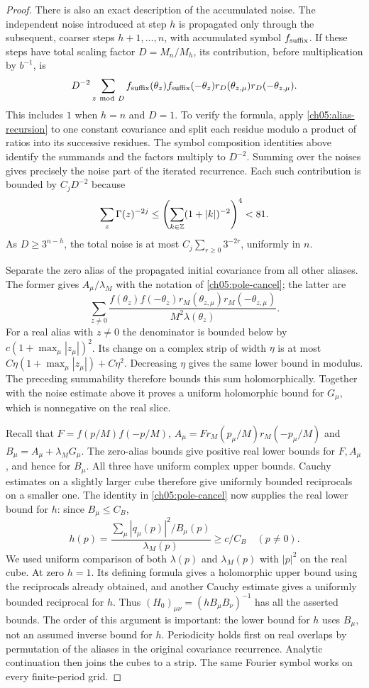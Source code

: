 \begin{proof}
There is also an exact description of the accumulated noise.
The independent noise introduced at step $h$ is propagated only
through the subsequent, coarser steps $h+1,\ldots,n$, with accumulated symbol $f_{\rm suffix}$. If these steps have total scaling factor
$D=M_n/M_h$, its contribution, before multiplication by $b^{-1}$,
is
\[
 D^{-2}\sum_{z\ {\rm mod}\ D}
   f_{\rm suffix}(\theta_z)f_{\rm suffix}(-\theta_z)
   r_D(\theta_{z,\mu})r_D(-\theta_{z,\mu}).
\]
This includes $1$ when $h=n$ and $D=1$.
To verify the formula, apply \eqref{ch05:alias-recursion} to one
constant covariance and split each residue modulo a product of
ratios into its successive residues. The symbol composition
identities above identify the summands and the factors multiply
to $D^{-2}$. Summing over the noises gives precisely the noise
part of the iterated recurrence.
Each such contribution is bounded by $C_jD^{-2}$ because
\[
 \sum_z\Gamma(z)^{-2j}\le
 \left(\sum_{k\in\mathbb Z}(1+|k|)^{-2}\right)^4<81.
\]
As $D\ge3^{n-h}$, the total noise is at most
$C_j\sum_{r\ge0}3^{-2r}$, uniformly in $n$.

Separate the zero alias of the propagated initial
covariance from all other aliases. The former gives
$A_\mu/\lambda_M$ with the notation of
\eqref{ch05:pole-cancel}; the latter are
\[
 \sum_{z\ne0}
 \frac{f(\theta_z)f(-\theta_z)
                 r_M(\theta_{z,\mu})r_M(-\theta_{z,\mu})}
                      {M^2\lambda(\theta_z)}.
\]
For a real alias with $z\ne0$ the denominator is bounded below
by $c(1+\max_\mu|z_\mu|)^2$. Its change on a complex strip of
width $\eta$ is at most
$C\eta(1+\max_\mu|z_\mu|)+C\eta^2$.
Decreasing $\eta$ gives the same lower bound in modulus.
The preceding summability therefore bounds this sum holomorphically.
Together with the noise estimate above it proves a uniform
holomorphic bound for $G_\mu$, which is nonnegative on the real
slice.

Recall that $F=f(p/M)f(-p/M)$,
$A_\mu=F r_M(p_\mu/M)r_M(-p_\mu/M)$ and
$B_\mu=A_\mu+\lambda_MG_\mu$.
The zero-alias bounds give positive real lower bounds for
$F,A_\mu$, and hence for $B_\mu$. All three have uniform complex
upper bounds. Cauchy estimates on a slightly larger cube therefore
give uniformly bounded reciprocals on a smaller one.
The identity in \eqref{ch05:pole-cancel} now supplies the real
lower bound for $h$: since $B_\mu\le C_B$,
\[
 h(p)=\frac{\sum_\mu |q_\mu(p)|^2/B_\mu(p)}{\lambda_M(p)}
          \ge c/C_B\quad(p\ne0).
\]
We used uniform comparison of both $\lambda(p)$ and
$\lambda_M(p)$ with $|p|^2$ on the real cube. At zero $h=1$.
Its defining formula gives a holomorphic upper bound using the
reciprocals already obtained, and another Cauchy estimate gives
a uniformly bounded reciprocal for $h$.
Thus $(H_0)_{\mu\nu}=(hB_\mu B_\nu)^{-1}$ has all the asserted
bounds. The order of this argument is important: the lower bound
for $h$ uses $B_\mu$, not an assumed inverse bound for $h$.
Periodicity holds first on real overlaps by permutation of the
aliases in the original covariance recurrence. Analytic continuation
then joins the cubes to a strip. The same Fourier symbol works on
every finite-period grid.
\end{proof}

